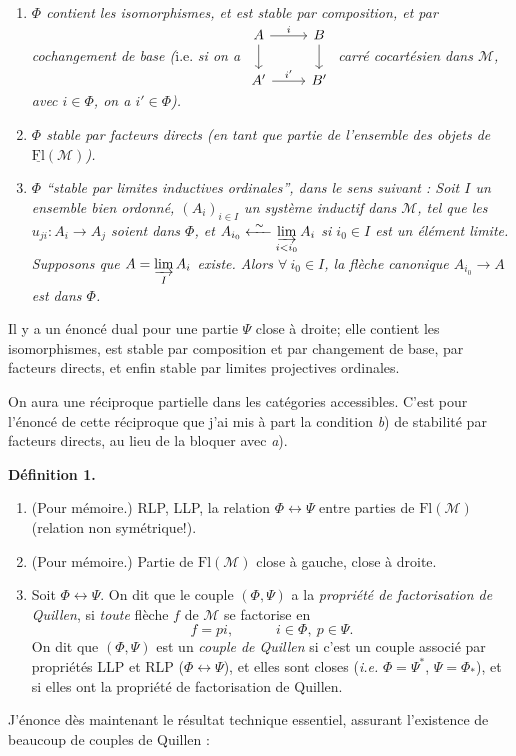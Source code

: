 \documentclass[11pt]{article}
\newcommand{\msp}[1]{\marginpar{\footnotesize [#1]}}
\newcommand{\Fl}{\mathrm{Fl}}
\newcommand{\M}{\mathcal{M}}
\begin{document}
\begin{enumerate}[label={}]
\item[a)] \textit{$\Phi$ contient les isomorphismes, et est stable par composition, et par cochangement de base (}i.e. \textit{si on a}
$\vcenter{\hbox{\begin{tikzcd}
A \arrow[r, "i"] \arrow[d] & B \arrow[d] \\
A' \arrow[r, "i'"] & B'
\end{tikzcd}}}$
\textit{carré cocartésien dans $\M$, avec $i \in \Phi$, on a $i' \in \Phi$).}

\item[b)] \textit{$\Phi$ stable par facteurs directs (en tant que partie de l'ensemble des objets de} $\underline{\Fl}(\M)$\textit{).}

\item[c)] \textit{$\Phi$ ``stable par limites inductives ordinales'', dans le sens suivant : Soit $I$ un ensemble bien ordonné, $(A_i)_{i \in I}$ un système inductif dans $\M$, tel que les $u_{ji} : A_i \longrightarrow A_j$ soient dans $\Phi$, et $A_{i_0} \xleftarrow{\ \sim\ } \varinjlim\limits_{i<i_0} A_i$ si $i_0 \in I$ est un élément limite. Supposons que $A = \varinjlim\limits_{I} A_i$ existe. Alors $\forall\ i_0 \in I$, la flèche canonique $A_{i_0} \longrightarrow A$ est dans $\Phi$.}
\end{enumerate}

Il y a un énoncé dual pour une partie $\Psi$ close à droite; elle contient les isomorphismes, est stable par composition et par changement de base, par facteurs directs, et enfin stable par limites projectives ordinales.

\msp{page 5}

On aura une réciproque partielle dans les catégories accessibles. C'est pour l'énoncé de cette réciproque que j'ai mis à part la condition \textit{b}) de stabilité par facteurs directs, au lieu de la bloquer avec \textit{a}).

\noindent\textbf{Définition 1.}

\begin{enumerate}[label={}]
\item[\textit{a})] (Pour mémoire.) RLP, LLP, la relation $\Phi \longleftrightarrow \Psi$ entre parties de $\Fl(\M)$ (relation non symétrique!).

\item[\textit{b})] (Pour mémoire.) Partie de $\Fl(\M)$ close à gauche, close à droite.

\item[\textit{c})] Soit $\Phi \longleftrightarrow \Psi$. On dit que le couple $(\Phi, \Psi)$ a la \textit{propriété de factorisation de Quillen}, si \textit{toute} flèche $f$ de $\M$ se factorise en
\[
f = pi, \qquad\quad i \in \Phi,\ p \in \Psi.
\]
On dit que $(\Phi, \Psi)$ est un \textit{couple de Quillen} si c'est un couple associé par propriétés LLP et RLP ($\Phi \longleftrightarrow \Psi$), et elles sont closes (\textit{i.e.} $\Phi = \Psi^*$, $\Psi = \Phi_*$), et si elles ont la propriété de factorisation de Quillen.
\end{enumerate}

J'énonce dès maintenant le résultat technique essentiel, assurant l'existence de beaucoup de couples de Quillen :
\end{document}
